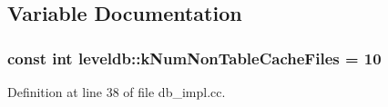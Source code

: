 \subsection{Variable Documentation}
\hypertarget{namespaceleveldb_a550686b2c442f4c3011d68dd12c38662}{}
\subsubsection[{k\+Num\+Non\+Table\+Cache\+Files}]{\setlength{\rightskip}{0pt plus 5cm}const int leveldb\+::k\+Num\+Non\+Table\+Cache\+Files = 10}\label{namespaceleveldb_a550686b2c442f4c3011d68dd12c38662}


Definition at line 38 of file db\+\_\+impl.\+cc.

